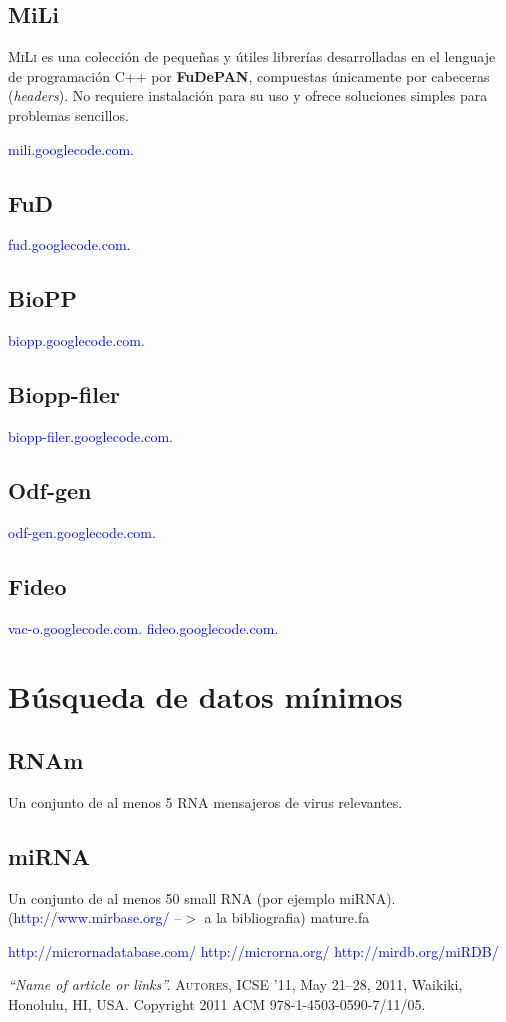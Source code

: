 \documentclass[12pt,a4paper,spanish]{article}
\begin{document}
	\subsection{MiLi}
		\textsc{MiLi} es una colección de pequeñas y útiles librerías desarrolladas en el lenguaje de programación C++ por \textbf{FuDePAN}, compuestas	  
		únicamente por cabeceras (\textit{headers}). No requiere instalación para su uso y ofrece soluciones simples para problemas sencillos.
		
		\textcolor{blue}{mili.googlecode.com.}

	\subsection{FuD}
		 \textcolor{blue}{fud.googlecode.com.}

	\subsection{BioPP}
		 \textcolor{blue}{biopp.googlecode.com.}

	\subsection{Biopp-filer}
		 \textcolor{blue}{biopp-filer.googlecode.com.}

	\subsection{Odf-gen}
		 \textcolor{blue}{odf-gen.googlecode.com.}

	\subsection{Fideo}
		  \textcolor{blue}{vac-o.googlecode.com.} \textcolor{blue}{fideo.googlecode.com.}


\section{Búsqueda de datos mínimos}
	\subsection{RNAm}
		\par Un conjunto de al menos 5 RNA mensajeros de virus relevantes.
	\subsection{miRNA}
		\par Un conjunto de al menos 50 small RNA (por ejemplo miRNA). (\textcolor{blue}{http://www.mirbase.org/} --$>$ a la bibliografia) mature.fa

	\textcolor{blue}{http://micrornadatabase.com/}
	\textcolor{blue}{http://microrna.org/}
	\textcolor{blue}{http://mirdb.org/miRDB/}

\begin{thebibliography}{99}
\small	{} {\em{“Name of article or links”}.}
			\textsc{Autores}, ICSE ’11, May 21–28, 2011, Waikiki, Honolulu, HI, USA. Copyright 2011 ACM 978-1-4503-0590-7/11/05.
\end{thebibliography}
\end{document}
